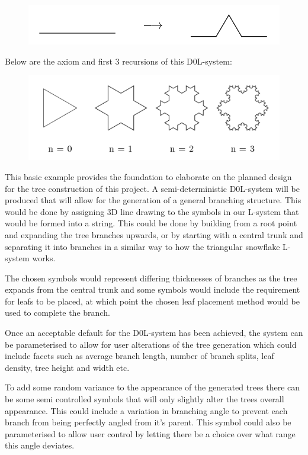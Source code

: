 \documentclass[progress]{cmpreport}
\begin{document}
\begin{figure}[h]
        \includegraphics[scale=0.4]{production_p1}
        \centering
\end{figure}

\noindent Below are the axiom and first 3 recursions of this D0L-system:

\begin{figure}[h]
        \includegraphics[scale=0.5]{triangle_snowflake_lsystem}
        \centering
\end{figure}

This basic example provides the foundation to elaborate on the planned design for the tree 
construction of this project. A semi-deterministic D0L-system will be produced that will 
allow for the generation of a general branching structure. This would be done by assigning 
3D line drawing to the symbols in our L-system that would be formed into a string. This could 
be done by building from a root point and expanding the tree branches upwards, or by starting 
with a central trunk and separating it into branches in a similar way to how the triangular 
snowflake L-system works.

The chosen symbols would represent differing thicknesses of branches as the tree expands from 
the central trunk and some symbols would include the requirement for leafs to be placed, at 
which point the chosen leaf placement method would be used to complete the branch. 

Once an acceptable default for the D0L-system has been achieved, the system can be parameterised 
to allow for user alterations of the tree generation which could include facets such as average 
branch length, number of branch splits, leaf density, tree height and width etc.

To add some random variance to the appearance of the generated trees there can be some semi 
controlled symbols that will only slightly alter the trees overall appearance. This could 
include a variation in branching angle to prevent each branch from being perfectly angled 
from it's parent. This symbol could also be parameterised to allow user control by letting 
there be a choice over what range this angle deviates.
\end{document}
